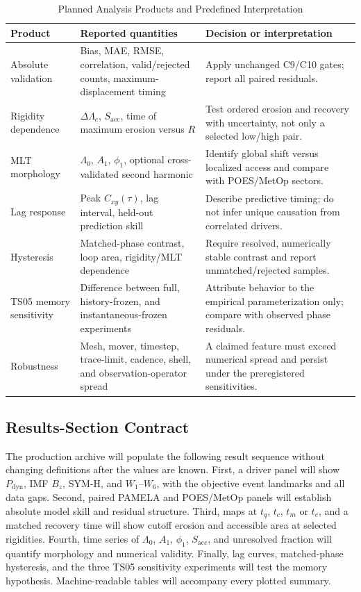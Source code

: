 \begin{table}
\caption{Planned Analysis Products and Predefined Interpretation}
\label{tab:exp-products}
\centering
\small
\begin{tabular}{p{}p{}p{}}
\toprule
Product & Reported quantities & Decision or interpretation \\
\midrule
Absolute validation & Bias, MAE, RMSE, correlation, valid/rejected counts, maximum-displacement timing & Apply unchanged C9/C10 gates; report all paired residuals. \\
Rigidity dependence & $\Delta\Lambda_c$, $S_{\mathrm{acc}}$, time of maximum erosion versus $R$ & Test ordered erosion and recovery with uncertainty, not only a selected low/high pair. \\
MLT morphology & $\Lambda_0$, $A_1$, $\phi_1$, optional cross-validated second harmonic & Identify global shift versus localized access and compare with POES/MetOp sectors. \\
Lag response & Peak $C_{xy}(\tau)$, lag interval, held-out prediction skill & Describe predictive timing; do not infer unique causation from correlated drivers. \\
Hysteresis & Matched-phase contrast, loop area, rigidity/MLT dependence & Require resolved, numerically stable contrast and report unmatched/rejected samples. \\
TS05 memory sensitivity & Difference between full, history-frozen, and instantaneous-frozen experiments & Attribute behavior to the empirical parameterization only; compare with observed phase residuals. \\
Robustness & Mesh, mover, timestep, trace-limit, cadence, shell, and observation-operator spread & A claimed feature must exceed numerical spread and persist under the preregistered sensitivities. \\
\bottomrule
\end{tabular}
\end{table}

\subsection{Results-Section Contract}

The production archive will populate the following result sequence without
changing definitions after the values are known. First, a driver panel will
show $P_{\mathrm{dyn}}$, IMF $B_z$, SYM-H, and $W_1$--$W_6$, with the objective
event landmarks and all data gaps. Second, paired PAMELA and POES/MetOp panels
will establish absolute model skill and residual structure. Third, maps at
$t_q$, $t_c$, $t_m$ or $t_e$, and a matched recovery time will show cutoff
erosion and accessible area at selected rigidities. Fourth, time series of
$\Lambda_0$, $A_1$, $\phi_1$, $S_{\mathrm{acc}}$, and unresolved fraction will
quantify morphology and numerical validity. Finally, lag curves, matched-phase
hysteresis, and the three TS05 sensitivity experiments will test the memory
hypothesis. Machine-readable tables will accompany every plotted summary.

